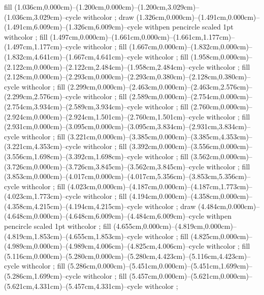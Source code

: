 {fill (1.036cm,0.000cm)--(1.200cm,0.000cm)--(1.200cm,3.029cm)--(1.036cm,3.029cm)--cycle withcolor ;
draw (1.326cm,0.000cm)--(1.491cm,0.000cm)--(1.491cm,6.009cm)--(1.326cm,6.009cm)--cycle withpen pencircle scaled 1pt withcolor ;
fill (1.497cm,0.000cm)--(1.661cm,0.000cm)--(1.661cm,1.177cm)--(1.497cm,1.177cm)--cycle withcolor ;
fill (1.667cm,0.000cm)--(1.832cm,0.000cm)--(1.832cm,4.641cm)--(1.667cm,4.641cm)--cycle withcolor ;
fill (1.958cm,0.000cm)--(2.122cm,0.000cm)--(2.122cm,2.484cm)--(1.958cm,2.484cm)--cycle withcolor ;
fill (2.128cm,0.000cm)--(2.293cm,0.000cm)--(2.293cm,0.380cm)--(2.128cm,0.380cm)--cycle withcolor ;
fill (2.299cm,0.000cm)--(2.463cm,0.000cm)--(2.463cm,2.576cm)--(2.299cm,2.576cm)--cycle withcolor ;
fill (2.589cm,0.000cm)--(2.754cm,0.000cm)--(2.754cm,3.934cm)--(2.589cm,3.934cm)--cycle withcolor ;
fill (2.760cm,0.000cm)--(2.924cm,0.000cm)--(2.924cm,1.501cm)--(2.760cm,1.501cm)--cycle withcolor ;
fill (2.931cm,0.000cm)--(3.095cm,0.000cm)--(3.095cm,3.834cm)--(2.931cm,3.834cm)--cycle withcolor ;
fill (3.221cm,0.000cm)--(3.385cm,0.000cm)--(3.385cm,4.353cm)--(3.221cm,4.353cm)--cycle withcolor ;
fill (3.392cm,0.000cm)--(3.556cm,0.000cm)--(3.556cm,1.698cm)--(3.392cm,1.698cm)--cycle withcolor ;
fill (3.562cm,0.000cm)--(3.726cm,0.000cm)--(3.726cm,3.845cm)--(3.562cm,3.845cm)--cycle withcolor ;
fill (3.853cm,0.000cm)--(4.017cm,0.000cm)--(4.017cm,5.356cm)--(3.853cm,5.356cm)--cycle withcolor ;
fill (4.023cm,0.000cm)--(4.187cm,0.000cm)--(4.187cm,1.773cm)--(4.023cm,1.773cm)--cycle withcolor ;
fill (4.194cm,0.000cm)--(4.358cm,0.000cm)--(4.358cm,4.215cm)--(4.194cm,4.215cm)--cycle withcolor ;
draw (4.484cm,0.000cm)--(4.648cm,0.000cm)--(4.648cm,6.009cm)--(4.484cm,6.009cm)--cycle withpen pencircle scaled 1pt withcolor ;
fill (4.655cm,0.000cm)--(4.819cm,0.000cm)--(4.819cm,1.853cm)--(4.655cm,1.853cm)--cycle withcolor ;
fill (4.825cm,0.000cm)--(4.989cm,0.000cm)--(4.989cm,4.006cm)--(4.825cm,4.006cm)--cycle withcolor ;
fill (5.116cm,0.000cm)--(5.280cm,0.000cm)--(5.280cm,4.423cm)--(5.116cm,4.423cm)--cycle withcolor ;
fill (5.286cm,0.000cm)--(5.451cm,0.000cm)--(5.451cm,1.699cm)--(5.286cm,1.699cm)--cycle withcolor ;
fill (5.457cm,0.000cm)--(5.621cm,0.000cm)--(5.621cm,4.331cm)--(5.457cm,4.331cm)--cycle withcolor ;
}
